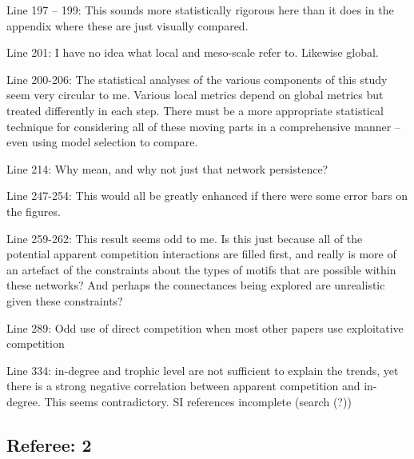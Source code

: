 \documentclass[12pt]{article}
\begin{document}
Line 197 – 199: This sounds more statistically rigorous here than it does in the appendix where these are just visually compared.

Line 201: I have no idea what local and meso-scale refer to. Likewise global.

Line 200-206: The statistical analyses of the various components of this study seem very circular to me. Various local metrics depend on global metrics but treated differently in each step. There must be a more appropriate statistical technique for considering all of these moving parts in a comprehensive manner – even using model selection to compare.

Line 214: Why mean, and why not just that network persistence?

Line 247-254: This would all be greatly enhanced if there were some error bars on the figures.

Line 259-262: This result seems odd to me. Is this just because all of the potential apparent competition interactions are filled first, and really is more of an artefact of the constraints about the types of motifs that are possible within these networks? And perhaps the connectances being explored are unrealistic given these constraints?

Line 289: Odd use of direct competition when most other papers use exploitative competition

Line 334: in-degree and trophic level are not sufficient to explain the trends, yet there is a strong negative correlation between apparent competition and in-degree. This seems contradictory.
SI references incomplete (search (?))

\subsection*{Referee: 2}
\end{document}
